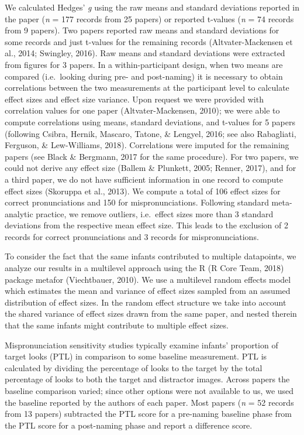 \documentclass[man]{apa6}
\begin{document}
We calculated Hedges' \emph{g} using the raw means and standard deviations reported in the paper (\emph{n} = 177 records from 25 papers) or reported t-values (\emph{n} = 74 records from 9 papers). Two papers reported raw means and standard deviations for some records and just t-values for the remaining records (Altvater-Mackensen et al., 2014; Swingley, 2016). Raw means and standard deviations were extracted from figures for 3 papers. In a within-participant design, when two means are compared (i.e.~looking during pre- and post-naming) it is necessary to obtain correlations between the two measurements at the participant level to calculate effect sizes and effect size variance. Upon request we were provided with correlation values for one paper (Altvater-Mackensen, 2010); we were able to compute correlations using means, standard deviations, and t-values for 5 papers (following Csibra, Hernik, Mascaro, Tatone, \& Lengyel, 2016; see also Rabagliati, Ferguson, \& Lew-Williams, 2018). Correlations were imputed for the remaining papers (see Black \& Bergmann, 2017 for the same procedure). For two papers, we could not derive any effect size (Ballem \& Plunkett, 2005; Renner, 2017), and for a third paper, we do not have sufficient information in one record to compute effect sizes (Skoruppa et al., 2013). We compute a total of 106 effect sizes for correct pronunciations and 150 for mispronunciations. Following standard meta-analytic practice, we remove outliers, i.e.~effect sizes more than 3 standard deviations from the respective mean effect size. This leads to the exclusion of 2 records for correct pronunciations and 3 records for mispronunciations.

To consider the fact that the same infants contributed to multiple datapoints, we analyze our results in a multilevel approach using the R (R Core Team, 2018) package metafor (Viechtbauer, 2010). We use a multilevel random effects model which estimates the mean and variance of effect sizes sampled from an assumed distribution of effect sizes. In the random effect structure we take into account the shared variance of effect sizes drawn from the same paper, and nested therein that the same infants might contribute to multiple effect sizes.

Mispronunciation sensitivity studies typically examine infants' proportion of target looks (PTL) in comparison to some baseline measurement. PTL is calculated by dividing the percentage of looks to the target by the total percentage of looks to both the target and distractor images. Across papers the baseline comparison varied; since other options were not available to us, we used the baseline reported by the authors of each paper. Most papers (\emph{n} = 52 records from 13 papers) subtracted the PTL score for a pre-naming baseline phase from the PTL score for a post-naming phase and report a difference score.
\end{document}
